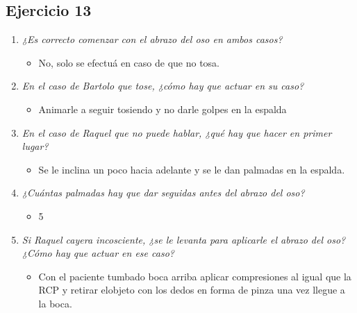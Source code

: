 \documentclass{article}
\begin{document}
      \subsection{Ejercicio 13}
        \begin{enumerate}[label=(\alph*)]
          \item \textit{¿Es correcto comenzar con el abrazo del oso en ambos casos?}
            \begin{itemize}
              \item No, solo se efectuá en caso de que no tosa.
            \end{itemize}
          \item \textit{En el caso de Bartolo que tose, ¿cómo hay que actuar en su caso?}
            \begin{itemize}
              \item Animarle a seguir tosiendo y no darle golpes en la espalda
            \end{itemize}
          \item \textit{En el caso de Raquel que no puede hablar, ¿qué hay que hacer en primer lugar?}
            \begin{itemize}
              \item Se le inclina un poco hacia adelante y se le dan palmadas en la espalda.
            \end{itemize}
          \item \textit{¿Cuántas palmadas hay que dar seguidas antes del abrazo del oso?}
            \begin{itemize}
              \item 5
            \end{itemize}
          \item \textit{Si Raquel cayera incosciente, ¿se le levanta para aplicarle el abrazo del oso?¿Cómo hay que actuar en ese caso?}
            \begin{itemize}
              \item Con el paciente tumbado boca arriba aplicar compresiones al igual que la RCP y retirar elobjeto con los dedos en forma de pinza una vez llegue a la boca.
            \end{itemize}
        \end{enumerate}
\end{document}
